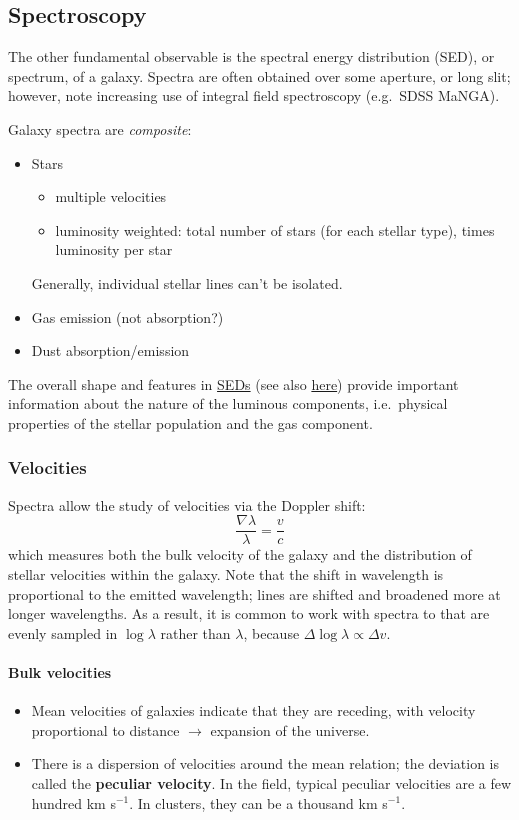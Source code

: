 \documentclass{article}
\newcommand{\mynotes}[1]{\textcolor{cadmiumgreen}{#1}}
\begin{document}
\subsection{Spectroscopy}
The other fundamental observable is the spectral energy distribution (SED),
or spectrum, of a galaxy. Spectra are often obtained over some aperture,
or long slit; however, note increasing use of integral field spectroscopy
(e.g.\ SDSS MaNGA).

Galaxy spectra are \textit{composite}:
\begin{itemize}
    \item Stars
        \begin{itemize}
            \item multiple velocities
            \item luminosity weighted: total number of
                stars (for each stellar type), times luminosity per star
        \end{itemize}
        Generally, individual stellar lines can't be isolated.
    \item Gas emission \mynotes{(not absorption?)}
    \item Dust absorption/emission
\end{itemize}

The overall shape and features in
\href{http://astronomy.nmsu.edu/holtz/a555/resources/galaxyspectra.gif}
{SEDs} (see also \href{http://astronomy.nmsu.edu/nicole/teaching/ASTR505/lectures/quickview.html}
{here}) provide important information about the nature of the luminous
components, i.e.\ physical properties of the stellar population and the gas
component.

\subsubsection{Velocities}
Spectra allow the study of velocities via the Doppler shift:
\[
    \frac{\nabla\lambda}{\lambda} = \frac{v}{c}
    \]
which measures both the bulk velocity of the galaxy and the distribution of
stellar velocities within the galaxy. Note that the shift in wavelength is
proportional to the emitted wavelength; lines are shifted and broadened more at
longer wavelengths. As a result, it is common to work with spectra to that are
evenly sampled in $\log \lambda$ rather than $\lambda$, because  $\Delta
\log\lambda \propto \Delta v$.

\paragraph{Bulk velocities}
\begin{itemize}
    \item Mean velocities of galaxies indicate that they are receding, with
        velocity proportional to distance $\rightarrow$ expansion of the
        universe.
    \item There is a dispersion of velocities around the mean relation; the
        deviation is called the \textbf{peculiar velocity}.  In the field,
        typical peculiar velocities are a few hundred km s$^{-1}$.  In
        clusters, they can be a thousand km s$^{-1}$.
\end{itemize}
\end{document}
